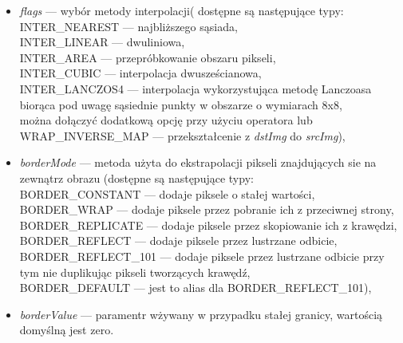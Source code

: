 \documentclass[a4paper,12pt]{article}
\begin{document}
                \begin{spacing}{1}
                \begin{itemize}
                    \item \textit{flags} --- wybór metody interpolacji( dostępne są następujące typy:\\
                    INTER\_NEAREST --- najbliższego sąsiada,\\ 
                    INTER\_LINEAR --- dwuliniowa,\\
                    INTER\_AREA --- przepróbkowanie obszaru pikseli,\\
                    INTER\_CUBIC --- interpolacja dwusześcianowa,\\
                    INTER\_LANCZOS4 --- interpolacja wykorzystująca metodę Lanczoasa biorąca pod uwagę sąsiednie punkty w obszarze o wymiarach 8x8,\\ 
                    można dołączyć dodatkową opcję przy użyciu operatora lub WRAP\_INVERSE\_MAP --- przekształcenie z \textit{dstImg} do \textit{srcImg}),
                    \item \textit{borderMode} --- metoda użyta do ekstrapolacji pikseli znajdujących sie na zewnątrz obrazu (dostępne są następujące typy:\\
                    BORDER\_CONSTANT --- dodaje piksele o stałej wartości,\\
                    BORDER\_WRAP --- dodaje piksele przez pobranie ich z przeciwnej strony,\\
                    BORDER\_REPLICATE --- dodaje piksele przez skopiowanie ich z krawędzi,\\
                    BORDER\_REFLECT --- dodaje piksele przez lustrzane odbicie,\\
                    BORDER\_REFLECT\_101 --- dodaje piksele przez lustrzane odbicie przy tym nie duplikując pikseli tworzących krawędź,\\
                    BORDER\_DEFAULT --- jest to alias dla BORDER\_REFLECT\_101),
                    \item \textit{borderValue} --- paramentr wżywany w przypadku stałej granicy, wartością domyślną jest zero.  
        		 \end{itemize}
        		 \end{spacing}
		 
\end{document}
